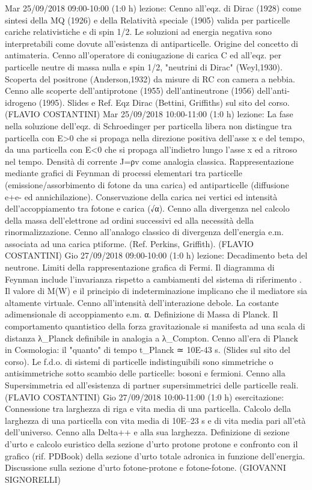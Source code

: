 \begin{itemize}
Mar 25/09/2018 09:00-10:00 (1:0 h) lezione: Cenno all'eqz. di Dirac (1928) come sintesi della MQ (1926) e della Relatività speciale (1905) valida per particelle cariche relativistiche e di spin 1/2. Le soluzioni ad energia negativa sono interpretabili come dovute all'esistenza di antiparticelle. Origine del concetto di antimateria. Cenno all'operatore di coniugazione di carica C ed all'eqz. per particelle neutre di massa nulla e spin 1/2, "neutrini di Dirac" (Weyl,1930). Scoperta del positrone (Anderson,1932) da misure di RC con camera a nebbia. Cenno alle scoperte dell'antiprotone (1955) dell'antineutrone (1956) dell'anti-idrogeno (1995). Slides e Ref. Eqz Dirac (Bettini, Griffiths) sul sito del corso. (FLAVIO COSTANTINI)
Mar 25/09/2018 10:00-11:00 (1:0 h) lezione: La fase nella soluzione dell'eqz. di Schroedinger per particella libera non distingue tra particella con E>0 che si propaga nella direzione positiva dell'asse x e del tempo, da una particella con E<0 che si propaga all'indietro lungo l'asse x ed a ritroso nel tempo. Densità di corrente J=ρv come analogia classica. Rappresentazione mediante grafici di Feynman di processi elementari tra particelle (emissione/assorbimento di fotone da una carica) ed antiparticelle (diffusione e+e- ed annichilazione). Conservazione della carica nei vertici ed intensità dell'accoppiamento tra fotone e carica (√α). Cenno alla divergenza nel calcolo della massa dell'elettrone ad ordini successivi ed alla necessità della rinormalizzazione. Cenno all'analogo classico di divergenza dell'energia e.m. associata ad una carica ptiforme. (Ref. Perkins, Griffith). (FLAVIO COSTANTINI)
Gio 27/09/2018 09:00-10:00 (1:0 h) lezione: Decadimento beta del neutrone. Limiti della rappresentazione grafica di Fermi. Il diagramma di Feynman include l'invarianza rispetto a cambiamenti del sistema di riferimento . Il valore di M(W) e il principio di indeterminazione implicano che il mediatore sia altamente virtuale. Cenno all'intensità dell'interazione debole. La costante adimensionale di accoppiamento e.m. α. Definizione di Massa di Planck. Il comportamento quantistico della forza gravitazionale si manifesta ad una scala di distanza λ_Planck definibile in analogia a λ_Compton. Cenno all'era di Planck in Cosmologia: il "quanto" di tempo t_Planck ≃ 10E-43 s. (Slides sul sito del corso). Le f.d.o. di sistemi di particelle indistinguibili sono simmetriche o antisimmetriche sotto scambio delle particelle: bosoni e fermioni. Cenno alla Supersimmetria ed all'esistenza di partner supersimmetrici delle particelle reali. (FLAVIO COSTANTINI)
Gio 27/09/2018 10:00-11:00 (1:0 h) esercitazione: Connessione tra larghezza di riga e vita media di una particella. Calcolo della larghezza di una particella con vita media di 10E–23 s e di vita media pari all’età dell’universo. Cenno alla Delta++ e alla sua larghezza. Definizione di sezione d’urto e calcolo euristico della sezione d’urto protone protone e confronto con il grafico (rif. PDBook) della sezione d’urto totale adronica in funzione dell’energia. Discussione sulla sezione d’urto fotone-protone e fotone-fotone. (GIOVANNI SIGNORELLI)

\end{itemize}
